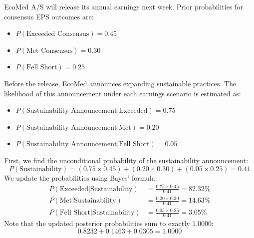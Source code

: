 \begin{tcolorbox}[
	colback=gray!5!white,
	colframe=black!15!white,
	boxrule=0.5pt,
	arc=3pt,
	title=\textbf{Case Study: Sustainability Investments and Earnings Expectations},
	coltitle=black,
	colbacktitle=black!5!white,
	before skip=6pt,
	after skip=6pt,
	breakable
]
EcoMed A/S will release its annual earnings next week. Prior probabilities for consensus EPS outcomes are:
\begin{itemize}
	\item $P(\text{Exceeded Consensus}) = 0.45$
	\item $P(\text{Met Consensus}) = 0.30$
	\item $P(\text{Fell Short}) = 0.25$
\end{itemize}
Before the release, EcoMed announces expanding sustainable practices. The likelihood of this announcement under each earnings scenario is estimated as:
\begin{itemize}
	\item $P(\text{Sustainability Announcement} | \text{Exceeded}) = 0.75$
	\item $P(\text{Sustainability Announcement} | \text{Met}) = 0.20$
	\item $P(\text{Sustainability Announcement} | \text{Fell Short}) = 0.05$
\end{itemize}
First, we find the unconditional probability of the sustainability announcement:
\[ P(\text{Sustainability}) = (0.75 \times 0.45) + (0.20 \times 0.30) + (0.05 \times 0.25) = 0.41 \]
We update the probabilities using Bayes' formula:
\begin{align*}
	P(\text{Exceeded} | \text{Sustainability}) &= \frac{0.75 \times 0.45}{0.41} = 82.32\% \\
	P(\text{Met} | \text{Sustainability}) &= \frac{0.20 \times 0.30}{0.41} = 14.63\% \\
	P(\text{Fell Short} | \text{Sustainability}) &= \frac{0.05 \times 0.25}{0.41} = 3.05\%
\end{align*}
Note that the updated posterior probabilities sum to exactly $1.0000$:
\[ 0.8232 + 0.1463 + 0.0305 = 1.0000 \]

\begin{center}
\end{center}
\end{tcolorbox}


